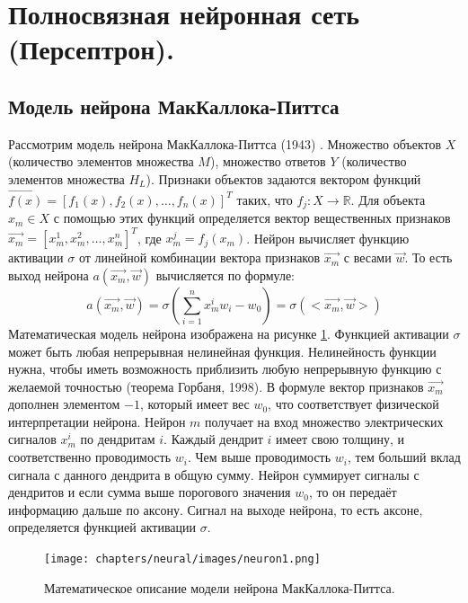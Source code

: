\section{Полносвязная нейронная сеть (Персептрон).}

\subsection{Модель нейрона МакКаллока-Питтса}

Рассмотрим модель нейрона МакКаллока-Питтса (1943) \cite{ModelMcCullochPitts}. Множество объектов $X$ (количество элементов множества $M$), множество ответов $Y$ (количество элементов множества $H_L$). Признаки объектов задаются вектором функций $\overrightarrow{f(x)} = [f_1(x), f_2(x), \dots, f_n(x)]^T$ таких, что $f_j: X \rightarrow \mathbb{R}$. Для объекта $x_m \in X$ с помощью этих функций определяется вектор вещественных признаков $\overrightarrow{x_m} = [x_m^1, x_m^2, \dots, x_m^n]^T$, где $x_m^j = f_j (x_m)$. Нейрон вычисляет функцию активации $\sigma$ от линейной комбинации вектора признаков $\overrightarrow{x_m}$ с весами $\overrightarrow{w}$. То есть выход нейрона $a(\overrightarrow{x_m}, \overrightarrow{w})$ вычисляется по формуле:
$$
a(\overrightarrow{x_m}, \overrightarrow{w}) = \sigma(\sum_{i = 1}^{n} x_m^i w_i - w_0) = \sigma (<\overrightarrow{x_m}, \overrightarrow{w}>)
$$
Математическая модель нейрона изображена на рисунке \ref{img:McCullochPittsModel}. Функцией активации $\sigma$ может быть любая непрерывная нелинейная функция. Нелинейность функции нужна, чтобы иметь возможность приблизить любую непрерывную функцию с желаемой точностью (теорема Горбаня, 1998). В формуле вектор признаков $\overrightarrow{x_m}$ дополнен элементом $-1$, который имеет вес $w_0$, что соответствует физической интерпретации нейрона. Нейрон $m$ получает на вход множество электрических сигналов $x_m^i$ по дендритам $i$. Каждый дендрит $i$ имеет свою толщину, и соответственно проводимость $w_i$. Чем выше проводимость $w_i$, тем больший вклад сигнала с данного дендрита в общую сумму. Нейрон суммирует сигналы с дендритов и если сумма выше порогового значения $w_0$, то он передаёт информацию дальше по аксону. Сигнал на выходе нейрона, то есть аксоне, определяется функцией активации $\sigma$.

\begin{figure}[h]
	\centering
	\texttt{[image: chapters/neural/images/neuron1.png]}
	\caption{Математическое описание модели нейрона МакКаллока-Питтса.}
	\label{img:McCullochPittsModel}
\end{figure}

